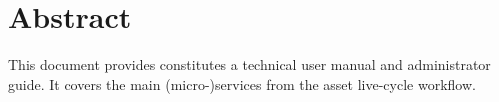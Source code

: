 \section*{Abstract}

	This document provides constitutes a technical user manual and administrator guide.
	It covers the main (micro-)services from the asset live-cycle workflow. 
	
	
